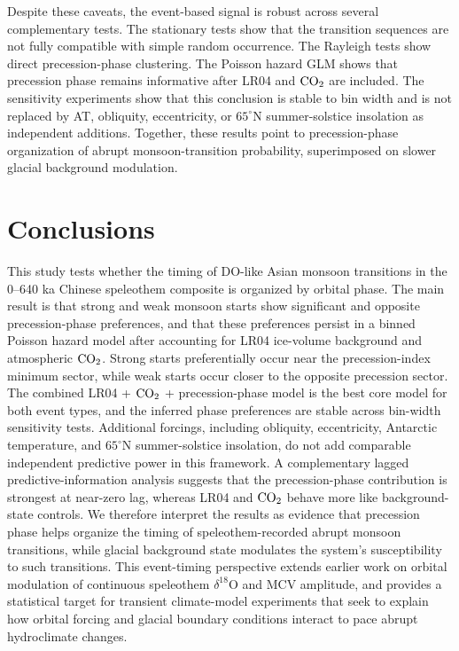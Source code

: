 \documentclass[11pt]{article}
\begin{document}
Despite these caveats, the event-based signal is robust across several complementary tests. The stationary tests show that the transition sequences are not fully compatible with simple random occurrence. The Rayleigh tests show direct precession-phase clustering. The Poisson hazard GLM shows that precession phase remains informative after LR04 and \(\ce{CO2}\) are included. The sensitivity experiments show that this conclusion is stable to bin width and is not replaced by AT, obliquity, eccentricity, or \(65^\circ\)N summer-solstice insolation as independent additions. Together, these results point to precession-phase organization of abrupt monsoon-transition probability, superimposed on slower glacial background modulation.

\section*{Conclusions}

This study tests whether the timing of DO-like Asian monsoon transitions in the 0--640 ka Chinese speleothem composite is organized by orbital phase. The main result is that strong and weak monsoon starts show significant and opposite precession-phase preferences, and that these preferences persist in a binned Poisson hazard model after accounting for LR04 ice-volume background and atmospheric \(\ce{CO2}\). Strong starts preferentially occur near the precession-index minimum sector, while weak starts occur closer to the opposite precession sector. The combined LR04 + \(\ce{CO2}\) + precession-phase model is the best core model for both event types, and the inferred phase preferences are stable across bin-width sensitivity tests. Additional forcings, including obliquity, eccentricity, Antarctic temperature, and \(65^\circ\)N summer-solstice insolation, do not add comparable independent predictive power in this framework. A complementary lagged predictive-information analysis suggests that the precession-phase contribution is strongest at near-zero lag, whereas LR04 and \(\ce{CO2}\) behave more like background-state controls. We therefore interpret the results as evidence that precession phase helps organize the timing of speleothem-recorded abrupt monsoon transitions, while glacial background state modulates the system's susceptibility to such transitions. This event-timing perspective extends earlier work on orbital modulation of continuous speleothem \(\delta^{18}\mathrm{O}\) and MCV amplitude, and provides a statistical target for transient climate-model experiments that seek to explain how orbital forcing and glacial boundary conditions interact to pace abrupt hydroclimate changes.
\end{document}
